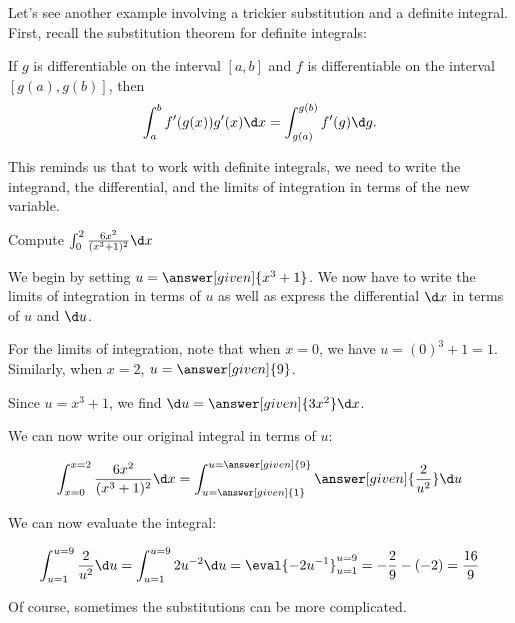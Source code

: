 \documentclass[nooutcomes]{ximera}
\begin{document}
Let's see another example involving a trickier substitution and a definite integral.  First, recall the substitution theorem for definite integrals:

\begin{theorem} 
If $g$ is differentiable on the interval $[a,b]$ and $f$ is
differentiable on the interval $[g(a),g(b)]$, then
\[
\int_a^b f'(g(x)) g'(x) \d x =\int_{g(a)}^{g(b)} f'(g) \d g.
\]
\end{theorem}

This reminds us that to work with definite integrals, we need to write the integrand, the differential, and the limits of integration in terms of the new variable.  

\begin{example}
Compute $\int_0^2 \frac{6x^2}{(x^3+1)^2} \d x$

\begin{explanation}
We begin by setting $u = \answer[given]{x^3+1}$.  We now have to write the limits of integration in terms of $u$ as well as express the differential $\d x$ in terms of $u$ and $\d u$.

For the limits of integration, note that when $x=0$, we have $u = (0)^3+1 = 1$.  Similarly, when $x=2$, $u=\answer[given]{9}$.

Since $u=x^3+1$, we find $\d u = \answer[given]{3x^2} \d x$.

We can now write our original integral in terms of $u$:

\[
\int_{x=0}^{x=2} \frac{6x^2}{(x^3+1)^2} \d x = \int_{u=\answer[given]{1}}^{u=\answer[given]{9}} \answer[given]{\frac{2}{u^2}} \d u
\]

We can now evaluate the integral:

\[
\int_{u=1}^{u=9} \frac{2}{u^2} \d u = \int_{u=1}^{u=9}2u^{-2} \d u = \eval{-2u^{-1}}_{u=1}^{u=9} = -\frac{2}{9} - (-2) = \frac{16}{9}
\]
\end{explanation}
\end{example}

Of course, sometimes the substitutions can be more complicated.
\end{document}
